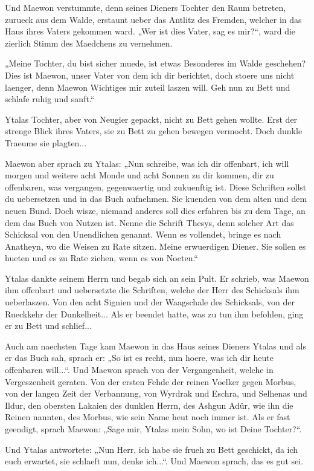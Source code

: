 \documentclass[a5paper,8pt]{book}
\begin{document}
Und Maewon verstummte, denn seines Dieners Tochter den Raum betreten, zurueck aus dem Walde, erstaunt ueber das Antlitz des Fremden, welcher in das Haus ihres Vaters gekommen ward. „Wer ist dies Vater, sag es mir?“, ward die zierlich Stimm des Maedchens zu vernehmen.

„Meine Tochter, du bist sicher muede, ist etwas Besonderes im Walde geschehen? Dies ist Maewon, unser Vater von dem ich dir berichtet, doch stoere uns nicht laenger, denn Maewon Wichtiges mir zuteil laszen will. Geh nun zu Bett und schlafe ruhig und sanft.“

Ytalas Tochter, aber von Neugier gepackt, nicht zu Bett gehen wollte. Erst der strenge Blick ihres Vaters, sie zu Bett zu gehen bewegen vermocht. Doch dunkle Traeume sie plagten...

Maewon aber sprach zu Ytalas: „Nun schreibe, was ich dir offenbart, ich will morgen und weitere acht Monde und acht Sonnen zu dir kommen, dir zu offenbaren, was vergangen, gegenwaertig und zukuenftig ist. Diese Schriften sollst du uebersetzen und in das Buch aufnehmen. Sie kuenden von dem alten und dem neuen Bund. Doch wisze, niemand anderes soll dies erfahren bis zu dem Tage, an dem das Buch von Nutzen ist. Nenne die Schrift Thesys, denn solcher Art das Schicksal von den Unendlichen genannt. Wenn es vollendet, bringe es nach Anatheyn, wo die Weisen zu Rate sitzen. Meine erwuerdigen Diener. Sie sollen es hueten und es zu Rate ziehen, wenn es von Noeten.“

Ytalas dankte seinem Herrn und begab sich an sein Pult. Er schrieb, was Maewon ihm offenbart und uebersetzte die Schriften, welche der Herr des Schicksals ihm ueberlaszen. Von den acht Signien und der Waagschale des Schicksals, von der Rueckkehr der Dunkelheit... Als er beendet hatte, was zu tun ihm befohlen, ging er zu Bett und schlief...

Auch am naechsten Tage kam Maewon in das Haus seines Dieners Ytalas und als er das Buch sah, sprach er: „So ist es recht, nun hoere, was ich dir heute offenbaren will...“. Und Maewon sprach von der Vergangenheit, welche in Vergeszenheit geraten. Von der ersten Fehde der reinen Voelker gegen Morbus, von der langen Zeit der Verbannung, von Wyrdrak und Eschra, und Selhenas und Ildur, den obersten Lakaien des dunklen Herrn, des Ashgun Adûr, wie ihn die Reinen nannten, des Morbus, wie sein Name heut noch immer ist. Als er fast geendigt, sprach Maewon: „Sage mir, Ytalas mein Sohn, wo ist Deine Tochter?“.

Und Ytalas antwortete: „Nun Herr, ich habe sie frueh zu Bett geschickt, da ich euch erwartet, sie schlaeft nun, denke ich...“. Und Maewon sprach, das es gut sei.
\end{document}
